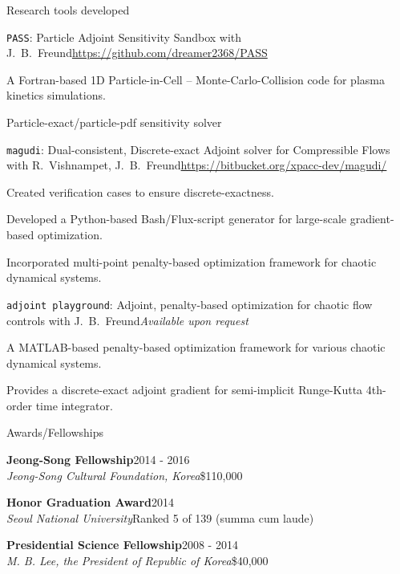 \documentclass{resume} %
\begin{document}

\begin{rSection}{Research tools developed}
\begin{rSubsection}{\texttt{PASS}: Particle Adjoint Sensitivity Sandbox}{}
{with J.\ B.\ Freund}{\url{https://github.com/dreamer2368/PASS}}
\item A Fortran-based 1D Particle-in-Cell -- Monte-Carlo-Collision code for plasma kinetics simulations.
\item Particle-exact/particle-pdf sensitivity solver
\end{rSubsection}
\begin{rSubsection}{\texttt{magudi}: Dual-consistent, Discrete-exact Adjoint solver for Compressible Flows}{}
{with R.\ Vishnampet, J.\ B.\ Freund}{\url{https://bitbucket.org/xpacc-dev/magudi/}}
\item Created verification cases to ensure discrete-exactness.
\item Developed a Python-based Bash/Flux-script generator for large-scale gradient-based optimization.
\item Incorporated multi-point penalty-based optimization framework for chaotic dynamical systems.
\end{rSubsection}
\begin{rSubsection}{\texttt{adjoint playground}: Adjoint, penalty-based optimization for chaotic flow controls}{}
{with J.\ B.\ Freund}{\em Available upon request}
\item A MATLAB-based penalty-based optimization framework for various chaotic dynamical systems.
\item Provides a discrete-exact adjoint gradient for semi-implicit Runge-Kutta 4th-order time integrator.
\end{rSubsection}
\end{rSection}



\begin{rSection}{Awards/Fellowships}

{\bf Jeong-Song Fellowship}\hfill 2014 - 2016\\
{\it Jeong-Song Cultural Foundation, Korea}\hfill \$110,000

{\bf Honor Graduation Award}\hfill 2014\\
{\it Seoul National University}\hfill Ranked 5 of 139 (summa cum laude)

{\bf Presidential Science Fellowship}\hfill 2008 - 2014\\
{\it M. B. Lee, the President of Republic of Korea}\hfill \$40,000

\end{rSection}
\end{document}
